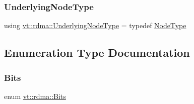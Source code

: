 \subsubsection{\texorpdfstring{Underlying\+Node\+Type}{UnderlyingNodeType}}
{\footnotesize\ttfamily using \hyperlink{namespacevt_1_1rdma_a20d01bc82b95453c162d4b9857a4a78a}{vt\+::rdma\+::\+Underlying\+Node\+Type} = typedef \hyperlink{namespacevt_a866da9d0efc19c0a1ce79e9e492f47e2}{Node\+Type}}



\subsection{Enumeration Type Documentation}
\mbox{\label{namespacevt_1_1rdma_a91e7211515508952960ca446ea609f65}} 
\subsubsection{\texorpdfstring{Bits}{Bits}}
{\footnotesize\ttfamily enum \hyperlink{namespacevt_1_1rdma_a91e7211515508952960ca446ea609f65}{vt\+::rdma\+::\+Bits}}

